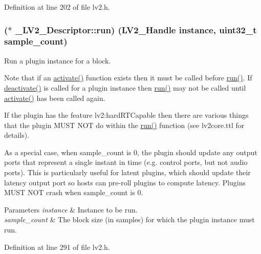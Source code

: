 Definition at line 202 of file lv2.\+h.

\subsubsection[{\texorpdfstring{run}{run}}]{($\ast$ \+\_\+\+L\+V2\+\_\+\+Descriptor\+::run) ({\bf L\+V2\+\_\+\+Handle} instance, {\bf uint32\+\_\+t} sample\+\_\+count)}\hypertarget{struct___l_v2___descriptor_ab137135b8024e88d5de9d252534f2b9b}{}\label{struct___l_v2___descriptor_ab137135b8024e88d5de9d252534f2b9b}
Run a plugin instance for a block.

Note that if an \hyperlink{struct___l_v2___descriptor_ad6bfac334042df6d51f4f0f7c0a72241}{activate()} function exists then it must be called before \hyperlink{struct___l_v2___descriptor_ab137135b8024e88d5de9d252534f2b9b}{run()}. If \hyperlink{struct___l_v2___descriptor_ab010fd53849be3de9beb99d7d936ab9c}{deactivate()} is called for a plugin instance then \hyperlink{struct___l_v2___descriptor_ab137135b8024e88d5de9d252534f2b9b}{run()} may not be called until \hyperlink{struct___l_v2___descriptor_ad6bfac334042df6d51f4f0f7c0a72241}{activate()} has been called again.

If the plugin has the feature lv2\+:hard\+R\+T\+Capable then there are various things that the plugin M\+U\+ST N\+OT do within the \hyperlink{struct___l_v2___descriptor_ab137135b8024e88d5de9d252534f2b9b}{run()} function (see lv2core.\+ttl for details).

As a special case, when {\ttfamily sample\+\_\+count} is 0, the plugin should update any output ports that represent a single instant in time (e.\+g. control ports, but not audio ports). This is particularly useful for latent plugins, which should update their latency output port so hosts can pre-\/roll plugins to compute latency. Plugins M\+U\+ST N\+OT crash when {\ttfamily sample\+\_\+count} is 0.


\begin{DoxyParams}{Parameters}
{\em instance} & Instance to be run.\\
\hline
{\em sample\+\_\+count} & The block size (in samples) for which the plugin instance must run. \\
\hline
\end{DoxyParams}


Definition at line 291 of file lv2.\+h.

